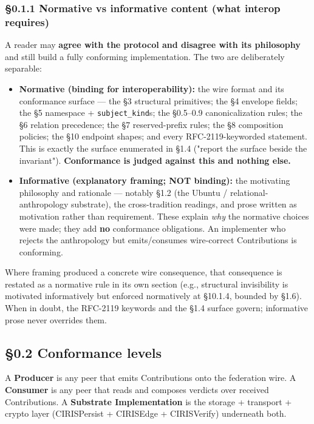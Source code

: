 \documentclass[10pt]{article}
\begin{document}
\subsubsection*{§0.1.1 Normative vs informative content (what interop requires)}


A reader may \textbf{agree with the protocol and disagree with its philosophy} and still build a fully conforming implementation. The two are deliberately separable:


\begin{itemize}\setlength\itemsep{0pt}
\item \textbf{Normative (binding for interoperability):} the wire format and its conformance surface — the §3 structural primitives; the §4 envelope fields; the §5 namespace + \texttt{subject\_kind}s; the §0.5–0.9 canonicalization rules; the §6 relation precedence; the §7 reserved-prefix rules; the §8 composition policies; the §10 endpoint shapes; and every RFC-2119-keyworded statement. This is exactly the surface enumerated in §1.4 ("report the surface beside the invariant"). \textbf{Conformance is judged against this and nothing else.}
\item \textbf{Informative (explanatory framing; NOT binding):} the motivating philosophy and rationale — notably §1.2 (the Ubuntu / relational-anthropology substrate), the cross-tradition readings, and prose written as motivation rather than requirement. These explain \textit{why} the normative choices were made; they add \textbf{no} conformance obligations. An implementer who rejects the anthropology but emits/consumes wire-correct Contributions is conforming.
\end{itemize}


Where framing produced a concrete wire consequence, that consequence is restated as a normative rule in its own section (e.g., structural invisibility is motivated informatively but enforced normatively at §10.1.4, bounded by §1.6). When in doubt, the RFC-2119 keywords and the §1.4 surface govern; informative prose never overrides them.



\subsection*{§0.2 Conformance levels}


A \textbf{Producer} is any peer that emits Contributions onto the federation wire. A \textbf{Consumer} is any peer that reads and composes verdicts over received Contributions. A \textbf{Substrate Implementation} is the storage + transport + crypto layer (CIRISPersist + CIRISEdge + CIRISVerify) underneath both.
\end{document}
